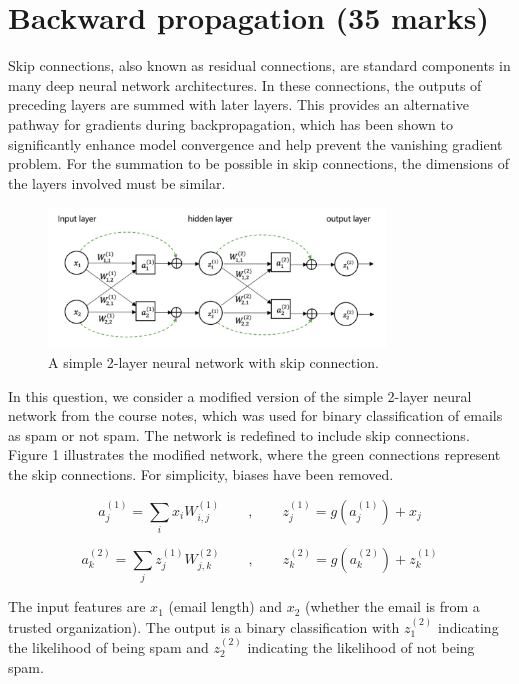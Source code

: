 \documentclass[12pt]{article}
\begin{document}
\section{Backward propagation (35 marks)}
Skip connections, also known as residual connections, are standard components in many deep neural network architectures. In these connections, the outputs of preceding layers are summed with later layers. This provides an alternative pathway for gradients during backpropagation, which has been shown to significantly enhance model convergence and help prevent the vanishing gradient problem. For the summation to be possible in skip connections, the dimensions of the layers involved must be similar.
\begin{figure}[hbt]
	\centering
	\includegraphics[width=0.8\textwidth]{skip_connection.png}
	\caption{A simple 2-layer neural network with skip connection. }
	\label{fig:pipeline}
\end{figure}


In this question, we consider a modified version of the simple 2-layer neural network from the course notes, which was used for binary classification of emails as spam or not spam. The network is redefined to include skip connections. Figure 1 illustrates the modified network, where the green connections represent the skip connections. For simplicity, biases have been removed.

\begin{equation}
	a^{(1)}_j = \sum_i x_i W_{i,j}^{(1)}\qquad,\qquad z_j^{(1)} = g(a^{(1)}_j) + x_j
\end{equation}

\begin{equation}
	a^{(2)}_k = \sum_j z_j^{(1)} W_{j,k}^{(2)}\qquad,\qquad z_k^{(2)} = g(a^{(2)}_k) + z_k^{(1)}
\end{equation}

The input features are $x_1$ (email length) and $x_2$ (whether the email is from a trusted organization). The output is a binary classification with $z^{(2)}_1$ indicating the likelihood of being spam and $z^{(2)}_2$ indicating the likelihood of not being spam.
\end{document}
